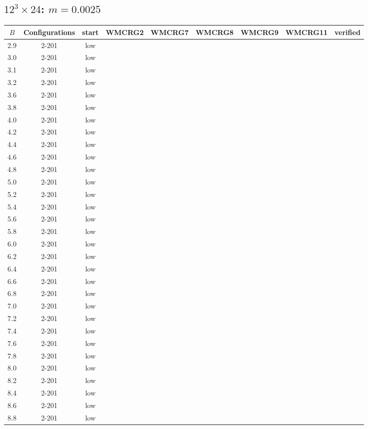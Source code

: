 \documentclass{article}
\begin{document}
\begin{center}
  \section*{$12^3\times24$:  $m=0.0025$}
    \begin{center}
    \begin{tabular}{| c | c | c | c | c | c | c | c | c |}
      \hline
      $B$ & Configurations & start & WMCRG2 & WMCRG7 & WMCRG8 & WMCRG9 & WMCRG11 & verified\\
      \hline
      2.9 & 2-201 & low &  &  &  &  &  &\\
      3.0 & 2-201 & low &  &  &  &  &  &\\
      3.1 & 2-201 & low &  &  &  &  &  &\\
      3.2 & 2-201 & low &  &  &  &  &  &\\
      3.6 & 2-201 & low &  &  &  &  &  &\\
      3.8 & 2-201 & low &  &  &  &  &  &\\
      4.0 & 2-201 & low &  &  &  &  &  &\\
      4.2 & 2-201 & low &  &  &  &  &  &\\
      4.4 & 2-201 & low &  &  &  &  &  &\\
      4.6 & 2-201 & low &  &  &  &  &  &\\
      4.8 & 2-201 & low &  &  &  &  &  &\\
      5.0 & 2-201 & low &  &  &  &  &  &\\
      5.2 & 2-201 & low &  &  &  &  &  &\\
      5.4 & 2-201 & low &  &  &  &  &  &\\
      5.6 & 2-201 & low &  &  &  &  &  &\\
      5.8 & 2-201 & low &  &  &  &  &  &\\
      6.0 & 2-201 & low &  &  &  &  &  &\\
      6.2 & 2-201 & low &  &  &  &  &  &\\
      6.4 & 2-201 & low &  &  &  &  &  &\\
      6.6 & 2-201 & low &  &  &  &  &  &\\
      6.8 & 2-201 & low &  &  &  &  &  &\\
      7.0 & 2-201 & low &  &  &  &  &  &\\
      7.2 & 2-201 & low &  &  &  &  &  &\\
      7.4 & 2-201 & low &  &  &  &  &  &\\
      7.6 & 2-201 & low &  &  &  &  &  &\\
      7.8 & 2-201 & low &  &  &  &  &  &\\
      8.0 & 2-201 & low &  &  &  &  &  &\\
      8.2 & 2-201 & low &  &  &  &  &  &\\
      8.4 & 2-201 & low &  &  &  &  &  &\\
      8.6 & 2-201 & low &  &  &  &  &  &\\
      8.8 & 2-201 & low &  &  &  &  &  &\\
      \hline
    \end{tabular}
    \end{center}

\end{center}
\end{document}
